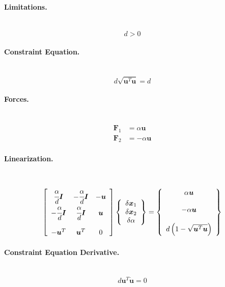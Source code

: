 \documentclass[10pt,fleqn,subeqn]{report}
\newcommand{\T}[1]{\bm{#1}}
\begin{document}
\paragraph{Limitations.} \
\begin{equation}
	d > 0
\end{equation}

\paragraph{Constraint Equation.} \
\begin{equation}
	d \sqrt{\T{u}^T \T{u}} = d
\end{equation}

\paragraph{Forces.} \
\begin{subequations}
\begin{align}
	\T{F}_1 &= \alpha \T{u} \\
	\T{F}_2 &= -\alpha \T{u}
\end{align}
\end{subequations}

\paragraph{Linearization.} \
\begin{equation}
	\sqbr{\matr{ccc}{
		\cfrac{\alpha}{d}\T{I} & -\cfrac{\alpha}{d}\T{I} & -\T{u} \\
		-\cfrac{\alpha}{d}\T{I} & \cfrac{\alpha}{d}\T{I} & \T{u} \\
		\\
		-\T{u}^T & \T{u}^T & 0
	}}\cubr{\cvvect{
		\delta\T{x}_1 \\
		\delta\T{x}_2 \\
		\delta\alpha
	}} = \cubr{\cvvect{
		\alpha \T{u} \\
		\\
		- \alpha \T{u} \\
		\\
		d\plbr{1 - \sqrt{\T{u}^T \T{u}}}
	}}
\end{equation}

\paragraph{Constraint Equation Derivative.} \
\begin{equation}
	d \T{u}^T \dot{\T{u}} = 0
\end{equation}
\end{document}
